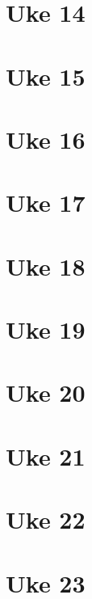 \documentclass{article}
\begin{document}
  \section{Uke 14}
  \section{Uke 15}
  \section{Uke 16}
  \section{Uke 17}
  \section{Uke 18}
  \section{Uke 19}
  \section{Uke 20}
  \section{Uke 21}
  \section{Uke 22}
  \section{Uke 23}
\end{document}
